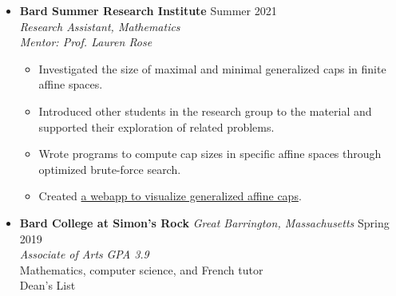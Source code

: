 \documentclass[12pt,letterpaper]{article}
\newenvironment{explist}
{\begin{itemize}[label=\textbf{--},itemsep=1pt,topsep=0pt,partopsep=0pt,parsep=0pt]}
{\end{itemize}}
\begin{document}
\begin{itemize}[label=]
    \item
        \textbf{Bard Summer Research Institute} \hfill Summer 2021\\
        \textit{Research Assistant, Mathematics}\\
        \textit{Mentor: Prof. Lauren Rose}
        \begin{explist}
        \item Investigated the size of maximal and minimal generalized caps in finite affine spaces.
        \item Introduced other students in the research group to the material and supported their exploration of related problems.
        \item Wrote programs to compute cap sizes in specific affine spaces through optimized brute-force search.
        \item Created \href{https://slickytail.github.io/QuadsVis/index.html}{a webapp to visualize generalized affine caps}.
        \end{explist}

    \item
        \textbf{Bard College at Simon's Rock} \textit{Great Barrington, Massachusetts} \hfill Spring 2019\\
        \textit{Associate of Arts} \hfill \textit{GPA 3.9}\\
        Mathematics, computer science, and French tutor\\
        Dean's List

\end{itemize}
\end{document}
